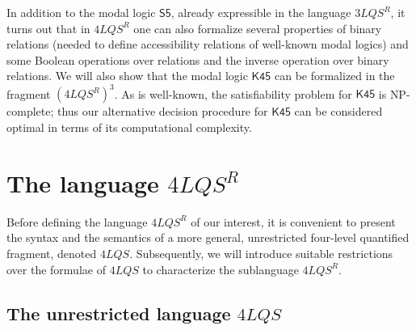 \documentclass{fundam}
\newcommand{\Sc}{\mathsf{S5}}
\newcommand{\Kqc}{\mathsf{K45}}
\newcommand{\QLQSR}{\ensuremath{\mbox{$4\mathit{LQS}^{R}$}}\xspace}
\newcommand{\TLQSR}{\ensuremath{\mbox{$3\mathit{LQS}^{R}$}}\xspace}
\newcommand{\QLQS}{\ensuremath{\mbox{$4\mathit{LQS}$}}\xspace}
\begin{document}
In addition to the modal logic $\Sc$, already expressible in the
language $\TLQSR$, it turns out that in $\QLQSR$ one can also
formalize several properties of binary relations (needed to define
accessibility relations of well-known modal logics) and some Boolean
operations over relations and the inverse operation over binary
relations.  We will also show that the modal logic $\Kqc$ can be
formalized in the fragment $(\QLQSR)^3$.  As is well-known, the
satisfiability problem for $\Kqc$ is \textsf{NP}-complete; thus our
alternative decision procedure for $\Kqc$ can be considered optimal in
terms of its computational complexity.


\section{The language $\QLQSR$}\label{language}
Before defining the language $\QLQSR$ of our interest, it is
convenient to present the syntax and the semantics of a more general,
unrestricted four-level quantified fragment, denoted $\QLQS$.
Subsequently, we will introduce suitable restrictions over the
formulae of $\QLQS$ to characterize the sublanguage $\QLQSR$.


\subsection{The unrestricted language $\QLQS$}\label{genericlanguage}
\end{document}
